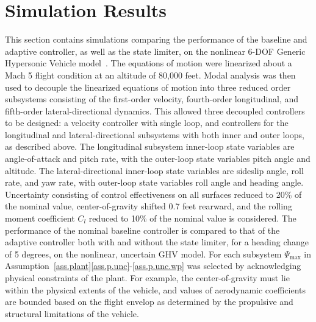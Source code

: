 \documentclass[journal]{IEEEtran}
\theoremstyle{innercustomthm}
\begin{document}
  \section{Simulation Results}

  This section contains simulations comparing the performance of the baseline and adaptive controller, as well as the state limiter, on the nonlinear 6-DOF Generic Hypersonic Vehicle model\ \cite{wiese.adaptive.2013, rollins.nonlinear.2013, wiese.gnc.2015, wiese.jgcd.2015}.
  The equations of motion were linearized about a Mach 5 flight condition at an altitude of 80,000 feet.
  Modal analysis was then used to decouple the linearized equations of motion into three reduced order subsystems consisting of the first-order velocity, fourth-order longitudinal, and fifth-order lateral-directional dynamics.
  This allowed three decoupled controllers to be designed: a velocity controller with single loop, and controllers for the longitudinal and lateral-directional subsystems with both inner and outer loops, as described above.
  The longitudinal subsystem inner-loop state variables are angle-of-attack and pitch rate, with the outer-loop state variables pitch angle and altitude.
  The lateral-directional inner-loop state variables are sideslip angle, roll rate, and yaw rate, with outer-loop state variables roll angle and heading angle.
  Uncertainty consisting of control effectiveness on all surfaces reduced to 20\% of the nominal value, center-of-gravity shifted 0.7 feet rearward, and the rolling moment coefficient $C_{l}$ reduced to 10\% of the nominal value is considered.
  The performance of the nominal baseline controller is compared to that of the adaptive controller both with and without the state limiter, for a heading change of 5 degrees, on the nonlinear, uncertain GHV model.
  For each subsystem $\Psi_{\text{max}}$ in Assumption~\ref{ass.plant}\ref{ass.p.unc}-\ref{ass.p.unc.wp} was selected by acknowledging physical constraints of the plant.
  For example, the center-of-gravity must lie within the physical extents of the vehicle, and values of aerodynamic coefficients are bounded based on the flight envelop as determined by the propulsive and structural limitations of the vehicle.
\end{document}
